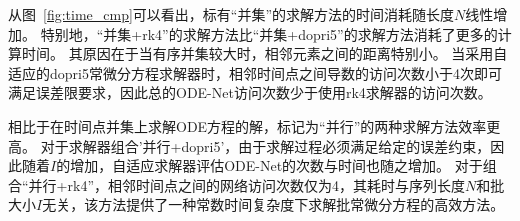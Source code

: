 从图~\ref{fig:time_cmp}可以看出，标有“并集”的求解方法的时间消耗随长度$N$线性增加。
特别地，“并集+rk4”的求解方法比“并集+dopri5”的求解方法消耗了更多的计算时间。
其原因在于当有序并集较大时，相邻元素之间的距离特别小。
当采用自适应的dopri5常微分方程求解器时，相邻时间点之间导数的访问次数小于4次即可满足误差限要求，因此总的ODE-Net访问次数少于使用rk4求解器的访问次数。

相比于在时间点并集上求解ODE方程的解，标记为“并行”的两种求解方法效率更高。
对于求解器组合'并行+dopri5'，由于求解过程必须满足给定的误差约束，因此随着$I$的增加，自适应求解器评估ODE-Net的次数与时间也随之增加。
对于组合“并行+rk4”，相邻时间点之间的网络访问次数仅为4，其耗时与序列长度$N$和批大小$I$无关，该方法提供了一种常数时间复杂度下求解批常微分方程的高效方法。

